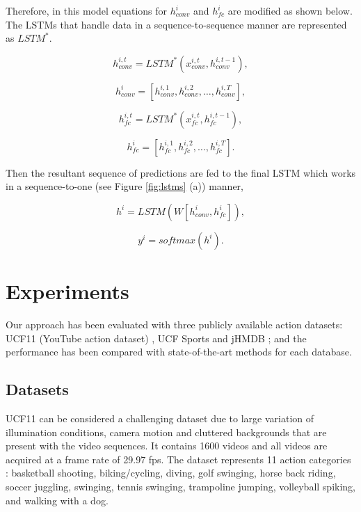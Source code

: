 \documentclass[10pt,twocolumn,letterpaper]{article}
\begin{document}
 Therefore, in this model equations for $h^i_{conv}$  and $h^i_{fc}$ are modified as shown below. The LSTMs that handle data in a sequence-to-sequence manner are represented as $LSTM^*$.


\begin{equation}
h^{i,t}_{conv}=LSTM^*(x^{i,t}_{conv}, h^{i,t-1}_{conv} ),
\label{eq:8}
\end{equation}

\begin{equation}
h^{i}_{conv}=[h^{i,1}_{conv},h^{i,2}_{conv}, \ldots,h^{i,T}_{conv}],
\label{eq:9}
\end{equation}

\begin{equation}
h^{i,t}_{fc}=LSTM^*(x^{i,t}_{fc}, h^{i,t-1}_{fc} ),
\label{eq:10}
\end{equation}

\begin{equation}
h^{i}_{fc}=[h^{i,1}_{fc},h^{i,2}_{fc}, \ldots,h^{i,T}_{fc}].
\label{eq:11}
\end{equation}

Then the resultant sequence of predictions are fed to the final LSTM which works in a sequence-to-one (see Figure \ref{fig:lstms} (a)) manner,

\begin{equation}
h^{i}= LSTM(W [h^i_{conv},h^i_{fc}]),
\label{eq:12}
\end{equation}

\begin{equation}
y^i=softmax(h^{i}).
\label{eq:13}
\end{equation}




\section{Experiments}

Our approach has been evaluated with three publicly available action datasets: UCF11 (YouTube action dataset) \cite{UCF11wild}, UCF Sports \cite{UCFSports2008, UCFSports2014}  and jHMDB \cite{jHMDB2013}; and the performance has been compared with state-of-the-art methods for each database.   


\subsection{Datasets}

UCF11 can be considered a challenging dataset due to large variation of illumination conditions, camera motion and cluttered backgrounds that are present with the video sequences. It contains 1600 videos and all videos are acquired at a frame rate of 29.97 fps. The dataset represents 11 action categories : basketball shooting, biking/cycling, diving, golf swinging, horse back riding, soccer juggling, swinging, tennis swinging, trampoline jumping, volleyball spiking, and walking with a dog.
\end{document}
